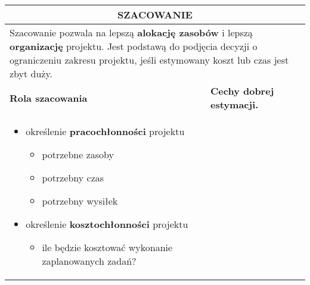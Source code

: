 \documentclass[../main.tex]{subfiles}
\begin{document}
    \begin{table}[H]
        \begin{center}
            \begin{tabular}{| p{8cm} | p{8cm} |}
                \hline
                \multicolumn{2}{|c|}{\textbf{SZACOWANIE}} \\
                \hline
                \hline
                \multicolumn{2}{|p{16cm}|}{ Szacowanie pozwala na lepszą \textbf{alokację zasobów} i lepszą \textbf{organizację} projektu. Jest podstawą do podjęcia
                decyzji o ograniczeniu zakresu projektu, jeśli estymowany koszt lub czas jest zbyt duży.
                } \\
                \hline
                \hline
                \textbf{Rola szacowania} & \textbf{Cechy dobrej estymacji.} \\
                \hline
                \begin{itemize}
                    \item określenie \textbf{pracochłonności} projektu
                    \begin{itemize}
                        \item potrzebne zasoby
                        \item potrzebny czas
                        \item potrzebny wysiłek
                    \end{itemize}
                    \item określenie \textbf{kosztochłonności} projektu
                    \begin{itemize}
                        \item ile będzie kosztować wykonanie zaplanowanych zadań?
                    \end{itemize}
                \end{itemize}


\end{tabular}
\end{center}
\end{table}
\end{document}

